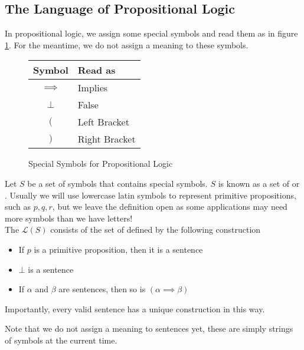 \documentclass[11pt]{article}
\begin{document}
\subsection{The Language of Propositional Logic}
In propositional logic, we assign some special symbols and read them as in figure \ref{fig:specialSymbolsProp}. For the meantime, we do not assign a meaning to these symbols.
\begin{figure}[H]
    \caption{Special Symbols for Propositional Logic}
    \label{fig:specialSymbolsProp}
    \centering
    \begin{tabular}{|c|l|}
        \hline
        Symbol & Read as \\ \hline \hline
        $\implies$ & Implies \\ \hline
        $\bot$ & False \\ \hline
        $($ & Left Bracket \\ \hline
        $)$ & Right Bracket \\ \hline
    \end{tabular}
\end{figure}
\begin{defi}
    Let $S$ be a set of symbols that contains special symbols. $S$ is known as a set of  or . Usually we will use lowercase latin symbols to represent primitive propositions, such as $p,q,r$, but we leave the definition open as some applications may need more symbols than we have letters!\\ The  $\mathcal{L}(S)$ consists of the set of  defined by the following construction
    \begin{itemize}
        \item If $p$ is a primitive proposition, then it is a sentence
        \item $\bot$ is a sentence
        \item If $\alpha$ and $\beta$ are sentences, then so is $(\alpha \implies \beta)$
    \end{itemize}
    Importantly, every valid sentence has a unique construction in this way.
\end{defi}
Note that we do not assign a meaning to sentences yet, these are simply strings of symbols at the current time. 
\printindex
\end{document}
